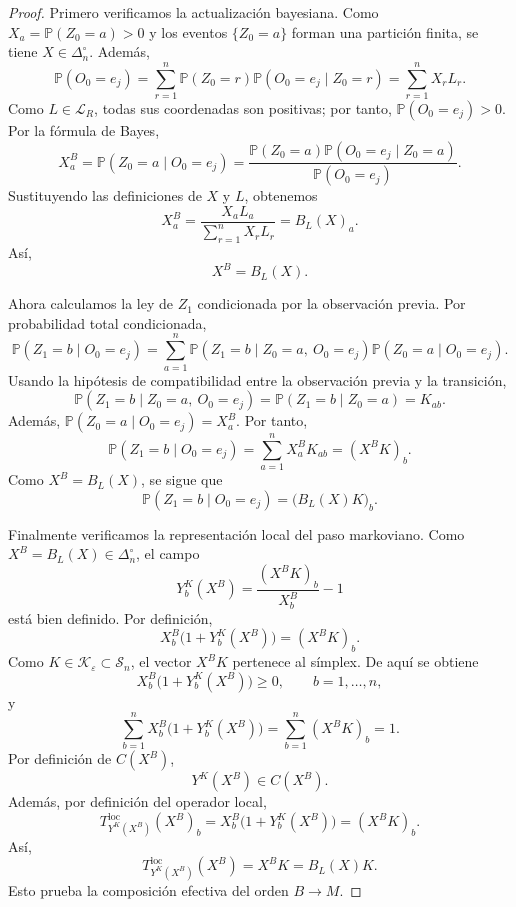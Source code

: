 ﻿\documentclass[12pt]{article}
\begin{document}
\begin{proof}
Primero verificamos la actualización bayesiana. Como \(X_a=\mathbb P(Z_0=a)>0\) y los eventos \(\{Z_0=a\}\) forman una partición finita, se tiene \(X\in\Delta_n^\circ\). Además,
\[
\mathbb P(O_0=e_j)
=
\sum_{r=1}^n
\mathbb P(Z_0=r)\mathbb P(O_0=e_j\mid Z_0=r)
=
\sum_{r=1}^nX_rL_r.
\]
Como \(L\in\mathcal L_R\), todas sus coordenadas son positivas; por tanto, \(\mathbb P(O_0=e_j)>0\). Por la fórmula de Bayes,
\[
X^B_a
=
\mathbb P(Z_0=a\mid O_0=e_j)
=
\frac{
\mathbb P(Z_0=a)\mathbb P(O_0=e_j\mid Z_0=a)
}{
\mathbb P(O_0=e_j)
}.
\]
Sustituyendo las definiciones de \(X\) y \(L\), obtenemos
\[
X^B_a
=
\frac{X_aL_a}{\sum_{r=1}^nX_rL_r}
=
B_L(X)_a.
\]
Así,
\[
X^B=B_L(X).
\]

Ahora calculamos la ley de \(Z_1\) condicionada por la observación previa. Por probabilidad total condicionada,
\[
\mathbb P(Z_1=b\mid O_0=e_j)
=
\sum_{a=1}^n
\mathbb P(Z_1=b\mid Z_0=a,\ O_0=e_j)
\mathbb P(Z_0=a\mid O_0=e_j).
\]
Usando la hipótesis de compatibilidad entre la observación previa y la transición,
\[
\mathbb P(Z_1=b\mid Z_0=a,\ O_0=e_j)
=
\mathbb P(Z_1=b\mid Z_0=a)
=
K_{ab}.
\]
Además, \(\mathbb P(Z_0=a\mid O_0=e_j)=X^B_a\). Por tanto,
\[
\mathbb P(Z_1=b\mid O_0=e_j)
=
\sum_{a=1}^nX^B_aK_{ab}
=
(X^BK)_b.
\]
Como \(X^B=B_L(X)\), se sigue que
\[
\mathbb P(Z_1=b\mid O_0=e_j)
=
\bigl(B_L(X)K\bigr)_b.
\]

Finalmente verificamos la representación local del paso markoviano. Como \(X^B=B_L(X)\in\Delta_n^\circ\), el campo
\[
Y_b^K(X^B)
=
\frac{(X^BK)_b}{X_b^B}-1
\]
está bien definido. Por definición,
\[
X_b^B\bigl(1+Y_b^K(X^B)\bigr)
=
(X^BK)_b.
\]
Como \(K\in\mathcal K_\varepsilon\subset\mathcal S_n\), el vector \(X^BK\) pertenece al símplex. De aquí se obtiene
\[
X_b^B\bigl(1+Y_b^K(X^B)\bigr)\ge 0,
\qquad b=1,\dots,n,
\]
y
\[
\sum_{b=1}^n
X_b^B\bigl(1+Y_b^K(X^B)\bigr)
=
\sum_{b=1}^n(X^BK)_b
=
1.
\]
Por definición de \(C(X^B)\),
\[
Y^K(X^B)\in C(X^B).
\]
Además, por definición del operador local,
\[
T^{\mathrm{loc}}_{Y^K(X^B)}(X^B)_b
=
X_b^B\bigl(1+Y_b^K(X^B)\bigr)
=
(X^BK)_b.
\]
Así,
\[
T^{\mathrm{loc}}_{Y^K(X^B)}(X^B)
=
X^BK
=
B_L(X)K.
\]
Esto prueba la composición efectiva del orden \(B\to M\).
\end{proof}
\end{document}
